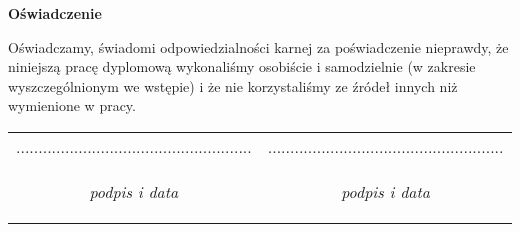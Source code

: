 \clearpage
\thispagestyle{empty}

\begin{center}
  \textbf{Oświadczenie}
\end{center}

\vskip 20pt

Oświadczamy, świadomi odpowiedzialności karnej za poświadczenie nieprawdy, że niniejszą pracę dyplomową wykonaliśmy osobiście i samodzielnie (w zakresie wyszczególnionym we wstępie) i że nie korzystaliśmy ze źródeł innych niż wymienione w pracy.

\vskip 60pt

\begin{center}
\begin{tabular}{c c}

..................................................... & ..................................................... \\
\begin{footnotesize}
\textit{podpis i data}
\end{footnotesize}
&
\begin{footnotesize}
\textit{podpis i data}
\end{footnotesize}
\\

\end{tabular}
\end{center}
